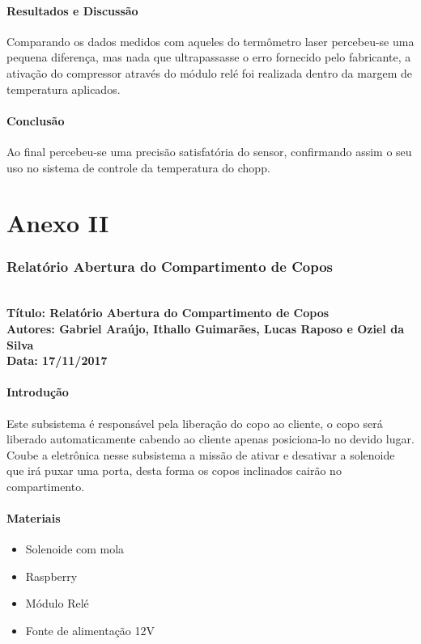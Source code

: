 \begin{anexosenv}
\subsubsection{Resultados e Discussão}
     Comparando os dados medidos com aqueles do termômetro laser percebeu-se uma pequena diferença, mas nada que ultrapassasse o erro fornecido pelo fabricante, a ativação do compressor através do módulo relé foi realizada dentro da margem de temperatura aplicados.
\subsubsection{Conclusão}
     Ao final percebeu-se uma precisão satisfatória do sensor, confirmando assim o seu uso no sistema de controle da temperatura do chopp.

\chapter{Anexo II}

\subsection{Relatório Abertura do Compartimento de Copos}     
\textbf{ \\
  Título: Relatório Abertura do Compartimento de Copos  \\
    Autores: Gabriel Araújo, Ithallo Guimarães, Lucas Raposo e Oziel da Silva \\
      Data: 17/11/2017} \\



\subsubsection{Introdução}
    Este subsistema é responsável pela liberação do copo ao cliente, o copo será liberado automaticamente cabendo ao cliente apenas posiciona-lo no devido lugar. Coube a eletrônica nesse subsistema a missão de ativar e desativar a solenoide que irá puxar uma porta, desta forma os copos inclinados cairão no compartimento.

\subsubsection{Materiais}
\begin{itemize}
     \item Solenoide com mola
     \item Raspberry
     \item Módulo Relé
     \item Fonte de alimentação 12V    
         

\end{itemize}
\end{anexosenv}
